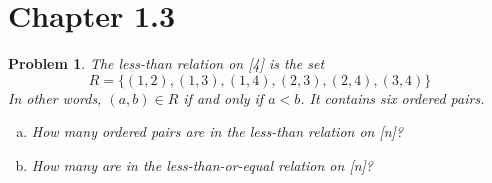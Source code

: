 \documentclass{article}
\theoremstyle{plain}
\newtheorem{problem}{Problem}
\begin{document}
\section{Chapter 1.3}
\setcounter{problem}{0}
\begin{problem}
    The less-than relation on [4] is the set
    \begin{equation*}
        R = \{(1,2), (1,3), (1,4), (2,3), (2,4), (3,4)\}
    \end{equation*}
    In other words, $(a,b) \in R$ if and only if $a<b$. It contains six ordered pairs.
    \begin{enumerate}[(a)]
        \item How many ordered pairs are in the less-than relation on [n]?
        \item How many are in the less-than-or-equal relation on [n]?
    \end{enumerate}
\end{problem}
\end{document}
